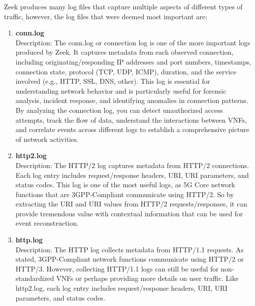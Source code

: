 \documentclass[final,1p,times,authoryear]{elsarticle}
\begin{document}
\vspace{1em}

Zeek produces many log files that capture multiple aspects of different types of traffic, however, the log files that were deemed most important are:

\begin{enumerate}[label=(\alph*)]
    \item \textbf{conn.log} \\
    Description: The conn.log or connection log is one of the more important logs produced by Zeek. It captures metadata from each observed connection, including originating/responding IP addresses and port numbers, timestamps, connection state, protocol (TCP, UDP, ICMP), duration, and the service involved (e.g., HTTP, SSL, DNS, other). This log is essential for understanding network behavior and is particularly useful for forensic analysis, incident response, and identifying anomalies in connection patterns. By analyzing the connection log, you can detect unauthorized access attempts, track the flow of data, understand the interactions between VNFs, and correlate events across different logs to establish a comprehensive picture of network activities.
    
    \item \textbf{http2.log} \\
    	Description: The HTTP/2 log captures metadata from HTTP/2 connections. Each log entry includes request/response headers, URI, URI parameters, and status codes. This log is one of the most useful logs, as 5G Core network functions that are 3GPP-Compliant communicate using HTTP/2. So by extracting the URI and URI values from HTTP/2 requests/responses, it can provide tremendous value with contextual information that can be used for event reconstruction.

    	
    \item \textbf{http.log} \\
    Description: The HTTP log collects metadata from HTTP/1.1 requests. As stated, 3GPP-Compliant network functions communicate using HTTP/2 or HTTP/3. However, collecting HTTP/1.1  logs can still be useful for non-standardized VNFs or perhaps providing more details on user traffic. Like http2.log, each log entry includes request/response headers, URI, URI parameters, and status codes.
    	

\end{enumerate}
\end{document}
